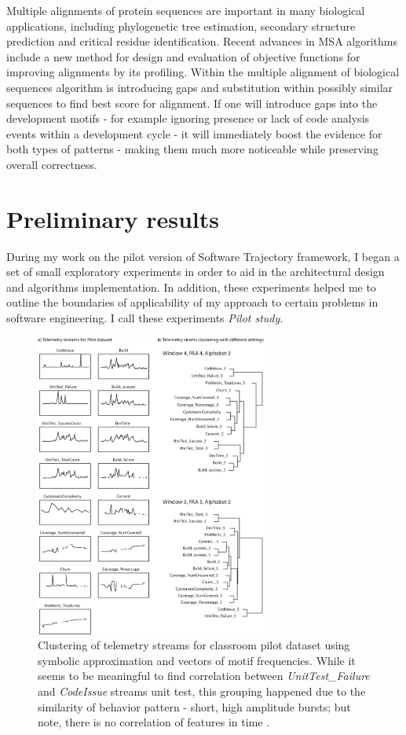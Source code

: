 \documentclass{sig-alternate}
\begin{document}
Multiple alignments of protein sequences are important in many biological applications, including phylogenetic tree estimation, secondary structure prediction and critical residue identification. Recent advances in MSA algorithms \cite{citeulike:692} include a new method for design and evaluation of objective functions for improving alignments by its profiling. Within the multiple alignment of biological sequences algorithm is introducing gaps and substitution within possibly similar sequences to find best score for alignment. If one will introduce gaps into the development motifs - for example ignoring presence or lack of code analysis events within a development cycle - it will immediately boost the evidence for both types of patterns - making them much more noticeable while preserving overall correctness.

\section{Preliminary results}
During my work on the pilot version of Software Trajectory framework, I began a set of small exploratory experiments in order to aid in the architectural design and algorithms implementation. In addition, these experiments helped me to outline the boundaries of applicability of my approach to certain problems in software engineering. I call these experiments \textit{Pilot study}.

\begin{figure}[tbp]
   \centering
   \includegraphics[height=100mm]{cluster_streams.eps}
   \caption{Clustering of telemetry streams for classroom pilot dataset using symbolic approximation and vectors of motif frequencies. While it seems to be meaningful to find correlation between \textit{UnitTest\_Failure} and \textit{CodeIssue} streams unit test, this grouping happened due to the similarity of behavior pattern - short, high amplitude bursts; but note, there is no correlation of features in time .}
   \label{fig:cluster_streams}
\end{figure}
\end{document}
